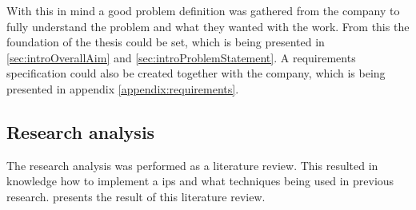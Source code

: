 \bigskip

With this in mind a good problem definition was gathered from the company to fully understand the problem and what they wanted with the work.
From this the foundation of the thesis could be set, which is being presented in \cref{sec:introOverallAim} and \ref{sec:introProblemStatement}.
A requirements specification could also be created together with the company, which is being presented in appendix \ref{appendix:requirements}.

\subsection{Research analysis}\label{sec:methodResearchAnalysis}
The research analysis was performed as a literature review. 
This resulted in knowledge how to implement a \acrfull{ips} and what techniques being used in previous research.
 presents the result of this literature review.
